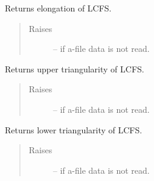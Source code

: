 \documentclass[letterpaper,10pt,english]{sphinxmanual}
\begin{document}
\begin{fulllineitems}
\begin{fulllineitems}
\end{fulllineitems}


\begin{fulllineitems}
\label{eqtools:eqtools.eqdskreader.EqdskReader.getElongation}
Returns elongation of LCFS.
\begin{quote}\begin{description}
\item[{Raises }] \leavevmode
{} -- 
if a-file data is not read.

\end{description}\end{quote}

\end{fulllineitems}


\begin{fulllineitems}
\label{eqtools:eqtools.eqdskreader.EqdskReader.getUpperTriangularity}
Returns upper triangularity of LCFS.
\begin{quote}\begin{description}
\item[{Raises }] \leavevmode
{} -- 
if a-file data is not read.

\end{description}\end{quote}

\end{fulllineitems}


\begin{fulllineitems}
\label{eqtools:eqtools.eqdskreader.EqdskReader.getLowerTriangularity}
Returns lower triangularity of LCFS.
\begin{quote}\begin{description}
\item[{Raises }] \leavevmode
{} -- 
if a-file data is not read.

\end{description}\end{quote}


\end{fulllineitems}
\end{fulllineitems}
\end{document}
